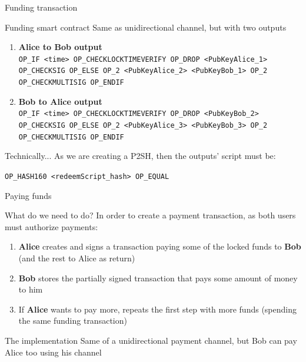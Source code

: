 \documentclass{beamer}
\begin{document}
\begin{frame}{Funding transaction}
 \begin{exampleblock}{Funding smart contract}
  Same as unidirectional channel, but with two outputs
  \pause
  \begin{center}
   \begin{enumerate}[<+->]
    \item \textbf{Alice to Bob output}\\
          \small{\texttt{OP\_IF <time> OP\_CHECKLOCKTIMEVERIFY OP\_DROP <PubKeyAlice\_1> OP\_CHECKSIG OP\_ELSE OP\_2 <PubKeyAlice\_2> <PubKeyBob\_1> OP\_2 OP\_CHECKMULTISIG OP\_ENDIF}}
    \item \textbf{Bob to Alice output}\\
          \small{\texttt{OP\_IF <time> OP\_CHECKLOCKTIMEVERIFY OP\_DROP <PubKeyBob\_2> OP\_CHECKSIG OP\_ELSE OP\_2 <PubKeyAlice\_3> <PubKeyBob\_3> OP\_2 OP\_CHECKMULTISIG OP\_ENDIF}}
   \end{enumerate}
  \end{center}
 \end{exampleblock}
 \pause
 \begin{exampleblock}{Technically...}
  As we are creating a P2SH, then the outputs' script must be:\
  \begin{center}
   \texttt{OP\_HASH160 <redeemScript\_hash> OP\_EQUAL}
  \end{center}

 \end{exampleblock}
\end{frame}
\begin{frame}{Paying funds}
 \begin{block}{What do we need to do?}
  In order to create a payment transaction, as both users must authorize payments:
  \begin{enumerate}
   \item \textbf{Alice} creates and signs a transaction paying some of the locked funds to \textbf{Bob} (and the rest to Alice as return)
   \item \textbf{Bob} stores the partially signed transaction that pays some amount of money to him
   \item If \textbf{Alice} wants to pay more, repeats the first step with more funds (spending the same funding transaction)
  \end{enumerate}
 \end{block}
 \pause
 \begin{block}{The implementation}
  Same of a unidirectional payment channel, but Bob can pay Alice too using his channel
 \end{block}
\end{frame}
\end{document}
